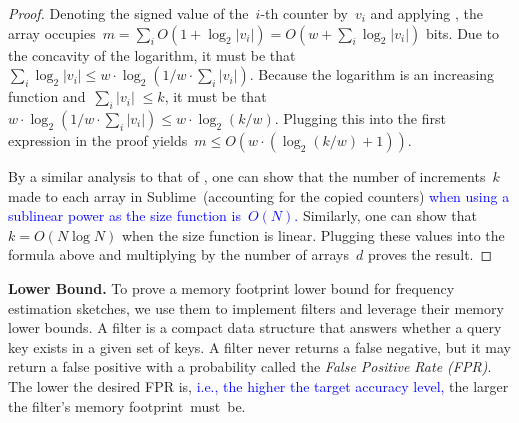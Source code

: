 \documentclass[sigconf]{acmart}
\newcommand{\sketch}{Sublime}
\begin{document}
\begin{proof}
    Denoting the signed value of the~$i${\nobreakdash-}th counter by~$v_i$ and
    applying , the array occupies~$m = \sum_i
    O(1+\log_2 |v_i|) = O\left( w+\sum_i \log_2 |v_i| \right)$ bits. Due to the
    concavity of the logarithm, it must be that~$\sum_i \log_2 |v_i| \leq w
    \cdot \log_2(1/w \cdot \sum_i |v_i|)$. Because the logarithm is an
    increasing function and~$\sum_i |v_i| \; \leq k$, it must be that~$w \cdot
    \log_2(1/w \cdot \sum_i |v_i|) \leq w \cdot \log_2(k/w)$. Plugging this
    into the first expression in the proof yields~$m \leq O(w \cdot (\log_2
    (k/w) + 1))$. 

    By a similar analysis to that of
    , one can show that
    the number of increments~$k$ made to each array in \sketch\ (accounting for
    the copied counters) \textcolor{blue}{when using a sublinear power as the
    size function is~$O(N)$.} Similarly, one can show that~$k=O(N \log N)$ when
    the size function is linear. Plugging these values into the formula above
    and multiplying by the number of arrays~$d$ proves the result.
\end{proof}

\textbf{Lower Bound.}
To prove a memory footprint lower bound for frequency estimation sketches, we
use them to implement filters and leverage their memory lower bounds. A filter
is a compact data structure that answers whether a query key exists in a given
set of keys. A filter never returns a false negative, but it may return a false
positive with a probability called the \emph{False Positive Rate (FPR)}. The
lower the desired FPR is, \textcolor{blue}{i.e., the higher the target accuracy
level,} the larger the filter's memory footprint~must~be. 
\end{document}
